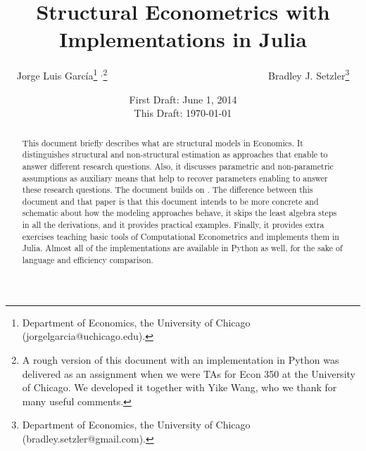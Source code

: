 




\title{\textbf{Structural Econometrics with Implementations in Julia}}
\author{Jorge Luis Garc\'{i}a\thanks{Department of Economics, the University of Chicago (jorgelgarcia@uchicago.edu).} $^{,}$\thanks{A rough version of this document with an implementation in Python was delivered as an assignment when we were TAs for Econ 350 at the University of Chicago. We developed it together with Yike Wang, who we thank for many useful comments.} \ \ \ \ \ \ \ \ \ \ \ \ \ \ \ \ \ \ \ \ \ \ \ \ \ \ \ \ \ \ \ \ Bradley J. Setzler\thanks{Department of Economics, the University of Chicago (bradley.setzler@gmail.com).}}
\date{First Draft: June 1, 2014 \\ This Draft: \today}
\maketitle

\begin{abstract}
\noindent This document briefly describes what are structural models in Economics. It distinguishes structural and non-structural estimation as approaches that enable to answer different research questions. Also, it discusses parametric and non-parametric assumptions as auxiliary means that help to recover parameters enabling to answer these research questions. The document builds on \citet{keane2011structural}. The difference between this document and that paper is that this document intends to be more concrete and schematic about how the modeling approaches behave, it skips the least algebra steps in all the derivations, and it provides practical examples. Finally, it provides extra exercises teaching basic tools of Computational Econometrics and implements them in Julia. Almost all of the implementations are available in Python as well, for the sake of language and efficiency comparison.
\end{abstract}





\clearpage


\clearpage

